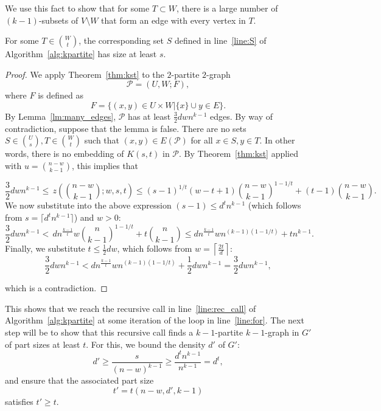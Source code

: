 We use this fact to show that for some $T \subset W$,
there is a large number of $(k-1)$-subsets of $V \setminus W$
that form an edge with every vertex in $T$.

\begin{lemma}\label{lm:return}
    For some $T \in \binom{W}{t}$, the corresponding set $S$ defined
    in line~\ref{line:S} of Algorithm~\ref{alg:kpartite} has size at least $s$.
    \begin{proof}
        We apply Theorem~\ref{thm:kst} to the $2$-partite $2$-graph
        \[
            \mathcal{P} = (U, W; F),
        \]
        where $F$ is defined as
        \[
            F = \{(x, y) \in U \times W | \{x\} \cup y \in E \}.
        \]
        By Lemma~\ref{lm:many_edges}, $\mathcal{P}$ has at least
        $\frac{3}{2}dwn^{k-1}$ edges.
        By way of contradiction, suppose that the lemma is false.
        There are no sets $S \in \binom{U}{s}, T \in \binom{W}{t}$
        such that $(x, y) \in E (\mathcal{P})$ for all $x \in S, y \in T $.
        In other words, there is no embedding of $K(s, t)$ in $\mathcal{P}$.
        By Theorem~\ref{thm:kst} applied with $u = \binom{n-w}{k-1}$,
        this implies that

        \[
            \frac{3}{2}dwn^{k-1} \leq
            \, z \left(\binom{n - w}{k-1}; w, s, t  \right) \leq
            (s-1)^{1/t}(w-t+1)\binom{n-w}{k-1}^{1-1/t} + (t-1)\binom{n-w}{k-1}.
        \]
        We now substitute into the above expression $(s-1) \leq d^t n^{k-1}$ (which
        follows from $s = \lceil d^t n^{k-1} \rceil$) and $w > 0$:
        \[
             \frac{3}{2}dwn^{k-1} <
             \, dn^{\frac{k-1}{t}} w \binom{n}{k-1}^{1-1/t} + t \binom{n}{k-1} \leq
             dn^{\frac{k-1}{t}} wn^{(k-1)(1-1/t)} + tn^{k-1}.
        \]
        Finally, we substitute $t \leq \frac{1}{2}dw$, which follows from
        $w = \left\lceil \frac{2t}{d} \right\rceil$:
        \[
            \frac{3}{2}dwn^{k-1} <
            dn^{\frac{k-1}{t}} wn^{(k-1)(1-1/t)} + \frac{1}{2} dwn^{k-1} =
            \frac{3}{2} dwn^{k-1},
        \]

        which is a contradiction.
    \end{proof}
\end{lemma}

This shows that we reach the recursive call in line~\ref{line:rec_call} of Algorithm~\ref{alg:kpartite}
at some iteration of the loop in line~\ref{line:for}.
The next step will be to show that this recursive call finds a $k-1$-partite $k-1$-graph in $G'$ of
part sizes at least $t$.
For this, we bound the density $d'$ of $G'$:
\[
    d' \geq \frac{s}{(n-w)^{k-1}} \geq \frac{d^t n^{k-1}}{n^{k-1}} = d^t,
\]
and ensure that the associated part size
\[
    t' = t(n - w, d', k - 1)
\]
satisfies $t' \geq t$.

